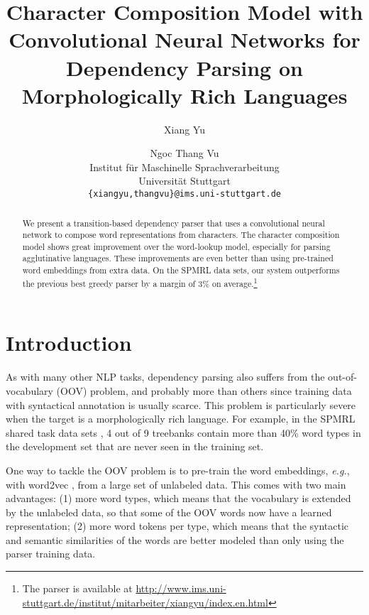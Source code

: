 \documentclass[11pt,a4paper]{article}
\title{Character Composition Model with Convolutional Neural Networks for Dependency Parsing on Morphologically Rich Languages}
\author{Xiang Yu \and Ngoc Thang Vu \\
  Institut f\"ur Maschinelle Sprachverarbeitung\\
  Universit\"at Stuttgart\\
  {\tt \{xiangyu,thangvu\}@ims.uni-stuttgart.de} }
\date{}
\begin{document}
\maketitle
\begin{abstract}
  We present a transition-based dependency parser that uses a convolutional neural network to compose word representations from characters. The character composition model shows great improvement over the word-lookup model, especially for parsing agglutinative languages. These improvements are even better than using pre-trained word embeddings from extra data. On the SPMRL data sets, our system outperforms the previous best greedy parser \citep{Ballesteros:2015} by a margin of 3\% on average.\footnote{The parser is available at \url{http://www.ims.uni-stuttgart.de/institut/mitarbeiter/xiangyu/index.en.html}}

\end{abstract}

\section{Introduction}
  

  As with many other NLP tasks, dependency parsing also suffers from the out-of-vocabulary (OOV) problem, and probably more than others since training data with syntactical annotation is usually scarce.
  This problem is particularly severe when the target is a morphologically rich language. For example, in the SPMRL shared task data sets \citep{Seddah:2013, Seddah:2014}, 4 out of 9 treebanks contain more than 40\% word types in the development set that are never seen in the training set.

  One way to tackle the OOV problem is to pre-train the word embeddings, {\em e.g.}, with word2vec \citep{Mikolov:2013}, from a large set of unlabeled data. 
  This comes with two main advantages: (1) more word types, which means that the vocabulary is extended by the unlabeled data, so that some of the OOV words now have a learned representation; (2) more word tokens per type, which means that the syntactic and semantic similarities of the words are better modeled than only using the parser training data.
\end{document}
